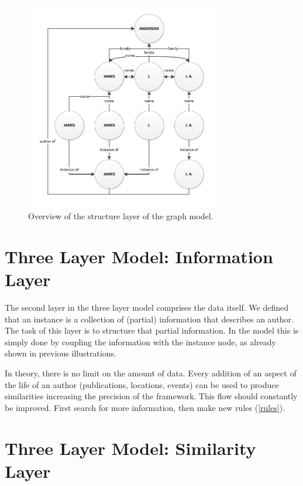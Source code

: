 \begin{figure}[htb]
	\centering
		\includegraphics[width=0.75\textwidth]{fig/graphstructureoverview}
	\caption{Overview of the structure layer of the graph model.}
	\label{fig:graphstructureoverview}
\end{figure}

\section{Three Layer Model: Information Layer}
\label{informationallayer}

The second layer in the three layer model comprises the data itself. We defined that an instance is a collection of (partial) information that describes an author. The task of this layer is to structure that partial information. In the model this is simply done by coupling the information with the instance node, as already shown in previous illustrations.

In theory, there is no limit on the amount of data. Every addition of an aspect of the life of an author (publications, locations, events) can be used to produce similarities increasing the precision of the framework. This flow should constantly be improved. First search for more information, then make new rules (\autoref{rules}).

\section{Three Layer Model: Similarity Layer}
\label{similaritylayer}

